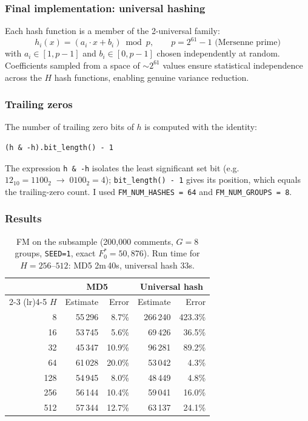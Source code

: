 \documentclass[11pt,a4paper]{article}
\begin{document}
\subsubsection*{Final implementation: universal hashing}
Each hash function is a member of the 2-universal family:
\[
  h_i(x) = (a_i \cdot x + b_i) \bmod p, \qquad
  p = 2^{61}-1 \text{ (Mersenne prime)}
\]
with $a_i \in [1, p-1]$ and $b_i \in [0, p-1]$ chosen independently at random.
Coefficients sampled from a space of $\sim 2^{61}$ values ensure statistical
independence across the $H$ hash functions, enabling genuine variance reduction.

\subsubsection*{Trailing zeros}
The number of trailing zero bits of $h$ is computed with the identity:
\begin{lstlisting}
(h & -h).bit_length() - 1
\end{lstlisting}
The expression \texttt{h \& -h} isolates the least significant set bit
(e.g.\ $12_{10} = 1100_2 \;\to\; 0100_2 = 4$); \texttt{bit\_length() - 1} gives its
position, which equals the trailing-zero count. I used \texttt{FM\_NUM\_HASHES = 64}
and \texttt{FM\_NUM\_GROUPS = 8}.

\subsubsection*{Results}

\begin{table}[H]
\centering
\begin{tabular}{r rr rr}
\toprule
& \multicolumn{2}{c}{MD5} & \multicolumn{2}{c}{Universal hash} \\
\cmidrule(lr){2-3} \cmidrule(lr){4-5}
$H$ & Estimate & Error & Estimate & Error \\
\midrule
  8 &  55\,296 &   8.7\% & 266\,240 & 423.3\% \\
 16 &  53\,745 &   5.6\% &  69\,426 &  36.5\% \\
 32 &  45\,347 &  10.9\% &  96\,281 &  89.2\% \\
 64 &  61\,028 &  20.0\% &  53\,042 &   4.3\% \\
128 &  54\,945 &   8.0\% &  48\,449 &   4.8\% \\
256 &  56\,144 &  10.4\% &  59\,041 &  16.0\% \\
512 &  57\,344 &  12.7\% &  63\,137 &  24.1\% \\
\bottomrule
\end{tabular}
\caption{FM on the subsample (200,000 comments, $G=8$ groups, \texttt{SEED=1},
  exact $F_0^* = 50{,}876$). Run time for $H=256$--$512$: MD5 2m\,40s, universal hash 33s.}
\label{tab:fm_subsample}
\end{table}
\end{document}
